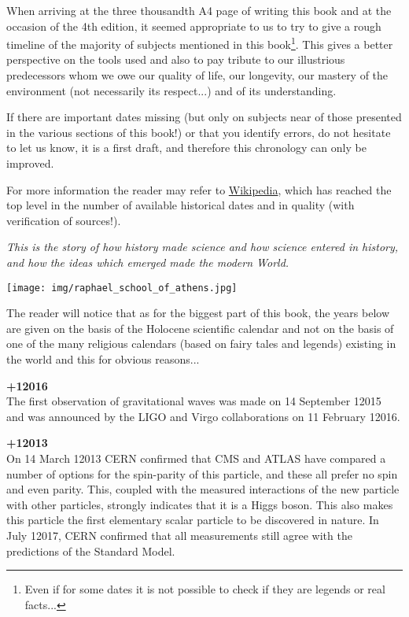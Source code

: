 When arriving at the three thousandth A4 page of writing this book and at the occasion of the 4th edition, it seemed appropriate to us to try to give a rough timeline of the majority of subjects mentioned in this book\footnote{Even if for some dates it is not possible to check if they are legends or real facts...}. This gives a better perspective on the tools used and also to pay tribute to our illustrious predecessors whom we owe our quality of life, our longevity, our mastery of the environment (not necessarily its respect...) and of its understanding.

If there are important dates missing (but only on subjects near of those presented in the various sections of this book!) or that you identify errors, do not hesitate to let us know, it is a first draft, and therefore this chronology can only be improved.

For more information the reader may refer to \href{http://www.wikipedia.com}{{\color{blue} Wikipedia}}, which has reached the top level in the number of available historical dates and in quality (with verification of sources!).

\begin{center}
\textit{This is the story of how history made science and how science entered in history, and how the ideas which emerged made the modern World.}
\end{center}

\texttt{[image: img/raphael\_school\_of\_athens.jpg]}

The reader will notice that as for the biggest part of this book, the years below are given on the basis of the Holocene scientific calendar and not on the basis of one of the many religious calendars (based on fairy tales and legends) existing in the world and this for obvious reasons...

\pagebreak

\textbf{+12016}\\
The first observation of gravitational waves was made on 14 September 12015 and was announced by the LIGO and Virgo collaborations on 11 February 12016.

\textbf{+12013}\\
On 14 March 12013 CERN confirmed that CMS and ATLAS have compared a number of options for the spin-parity of this particle, and these all prefer no spin and even parity. This, coupled with the measured interactions of the new particle with other particles, strongly indicates that it is a Higgs boson. This also makes this particle the first elementary scalar particle to be discovered in nature. In July 12017, CERN confirmed that all measurements still agree with the predictions of the Standard Model.


